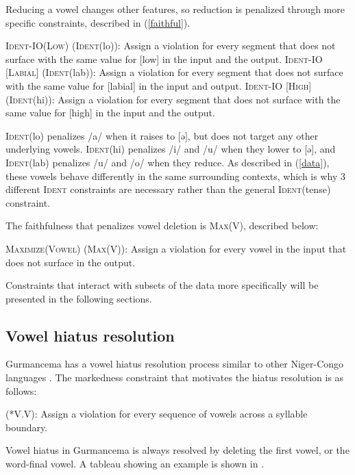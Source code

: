 \documentclass[output=paper,newtxmath,modfonts,nonflat,draftmode]{langsci/langscibook}
\begin{document}
Reducing a vowel changes other features, so reduction is penalized through more specific constraints, described in 
(\ref{faithful}).


\ea \label{faithful}
\ea \textsc{Ident-IO(Low)} (\textsc{Ident}(lo)): Assign a violation for every segment that does not surface with the same value for [low] in the input and the output.
\ex \textsc{Ident-IO [Labial]} (\textsc{Ident}(lab)): Assign a violation for every segment that does not surface with the same value for [labial] in the input and output.
\ex \textsc{Ident-IO [High]} (\textsc{Ident}(hi)):  Assign a violation for every segment that does not surface with the same value for [high] in the input and the output. 
\z
\z 

\textsc{Ident}(lo) penalizes /a/ when it raises to [ə], but does not target any other underlying vowels. \textsc{Ident}(hi) penalizes /i/ and /u/ when they lower to [ə], and \textsc{Ident}(lab) penalizes /u/ and /o/ when they reduce. As described in (\ref{data}), these vowels behave differently in the same surrounding contexts, which is why 3 different \textsc{Ident} constraints are necessary rather than the general \textsc{Ident}(tense) constraint. 
 
The faithfulness that penalizes vowel deletion is \textsc{Max}(V), described below:
  
\ea
\textsc{Maximize(Vowel)} (\textsc{Max(V)}): Assign a violation for every vowel in the input 	that does not surface in the output. 
\z

Constraints that interact with subsets of the data more specifically will be 
presented in the following sections. 

\subsection{Vowel hiatus resolution}

Gurmancema has a vowel hiatus resolution process similar to other Niger-Congo languages \citep{Casali1997}. 
The markedness constraint that motivates the hiatus resolution is as follows:

\ea
 (*V.V): Assign a violation for every sequence of vowels across a syllable boundary. 
\z
  
Vowel hiatus in Gurmancema is always resolved by deleting the first vowel, or the word-final vowel. A tableau showing an example is shown in .
  
\end{document}
